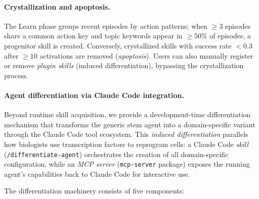 \documentclass{article}
\begin{document}
\paragraph{Crystallization and apoptosis.}
The Learn phase groups recent episodes by action patterns; when ${\geq}3$ episodes share a common action key and topic keywords appear in ${\geq}50\%$ of episodes, a progenitor skill is created. Conversely, crystallized skills with success rate ${<}0.3$ after ${\geq}10$ activations are removed (\emph{apoptosis}). Users can also manually register or remove \emph{plugin skills} (induced differentiation), bypassing the crystallization process.

\paragraph{Agent differentiation via Claude Code integration.}
Beyond runtime skill acquisition, we provide a development-time differentiation mechanism that transforms the generic stem agent into a domain-specific variant through the Claude Code tool ecosystem. This \emph{induced differentiation} parallels how biologists use transcription factors to reprogram cells: a Claude Code \emph{skill} (\texttt{/differentiate-agent}) orchestrates the creation of all domain-specific configuration, while an \emph{MCP server} (\texttt{mcp-server} package) exposes the running agent's capabilities back to Claude Code for interactive use.

The differentiation machinery consists of five components:
\end{document}
